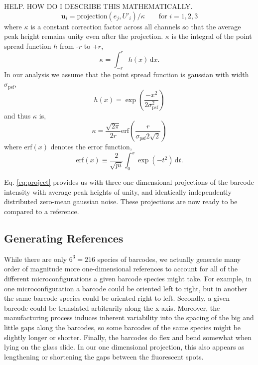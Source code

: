 HELP. HOW DO I DESCRIBE THIS MATHEMATICALLY. 
\begin{equation} \label{eq:project}
	\mathbf{u}_i = \text{projection}(e_j, U'_i) / \kappa \qquad \text{for } i=1,2,3
\end{equation}
where $\kappa$ is a constant correction factor across all channels so that the average peak height remains unity even after the projection. $\kappa$ is  the integral of the point spread function $h$ from -$r$ to +$r$,
\begin{equation}
	\kappa=\int_{-r}^{r} h(x) \, \mathrm{d}x.
\end{equation}
In our analysis we assume that the point spread function is gaussian with width $\sigma_{\text{psf}}$,
\begin{equation}\label{eq:psf}
h(x)=\exp \left(  \frac{-x^2}{2\sigma_{\text{psf}}^2} \right)
\end{equation}
and thus $\kappa$ is,
\begin{equation}
\kappa = \frac{\sqrt{2\pi}} {2r} \text{erf} \left(\frac{r}{\sigma_{\text{psf}}2\sqrt{2}} \right)
\end{equation}
where $\text{erf}(x)$ denotes the error function,
\begin{equation}
\text{erf}(x) \equiv  \frac{2}{\sqrt{pi}} \int_0^x \exp (-t^2) \, \mathrm{d}t.
\end{equation}

Eq. \ref{eq:project} provides us with three one-dimensional projections of the barcode intensity with average peak heights of unity, and identically independently distributed zero-mean gaussian noise. These projections are now ready to be compared to a reference. 

\subsection{Generating References}
While there are only $6^3=216$  species of barcodes, we actually generate many order of magnitude more one-dimensional references to account for all of the different microconfigurations a given barcode species might take. For example, in one microconfiguration a barcode could be oriented left to right, but in another the same barcode species could be oriented right to left. Secondly, a given barcode could be translated arbitrarily along the x-axis. Moreover, the manufacturing process induces inherent variability into the spacing of the big and little gaps along the barcodes, so some barcodes of the same species might be slightly longer or shorter. Finally, the barcodes do flex and bend somewhat when lying on the glass slide. In our one dimensional projection, this also appears as lengthening or shortening the gaps between the fluorescent spots.
 

